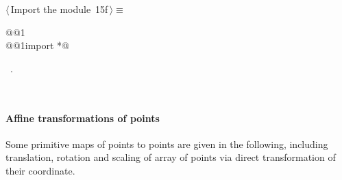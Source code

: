 \documentclass[11pt,oneside]{article}	%
\begin{document}
\begin{flushleft} \small
\begin{minipage}{\linewidth} \label{scrap32}
\protect{}$\langle\,$Import the module\nobreak\ {\footnotesize 15f}$\,\rangle\equiv$
\vspace{-1ex}
\begin{list}{}{} \item
\mbox{}\verb@import @@1\verb@@\\
\mbox{}\verb@from @@1\verb@ import *@\\
\mbox{}\verb@@{\NWsep}
\end{list}
\vspace{-1ex}
\footnotesize\addtolength{\baselineskip}{-1ex}
\begin{list}{}{\setlength{\itemsep}{-\parsep}\setlength{\itemindent}{-\leftmargin}}
\item \NWtxtMacroRefIn\ .
\end{list}
\end{minipage}\\[4ex]
\end{flushleft}

\paragraph{Affine transformations of points} Some primitive maps of points to points are given in the following, including translation, rotation and scaling of array of points via direct transformation of their coordinate.
\end{document}
